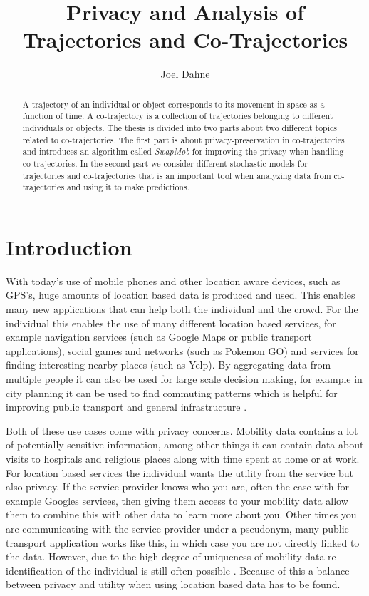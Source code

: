 \documentclass[12pt]{article}
\title{Privacy and Analysis of Trajectories and Co-Trajectories}
\author{Joel Dahne}
\theoremstyle{definition}
\begin{document}
\maketitle

\tableofcontents

\begin{abstract}
  A trajectory of an individual or object corresponds to its movement
  in space as a function of time. A co-trajectory is a collection of
  trajectories belonging to different individuals or objects. The
  thesis is divided into two parts about two different topics related
  to co-trajectories. The first part is about privacy-preservation in
  co-trajectories and introduces an algorithm called \emph{SwapMob}
  for improving the privacy when handling co-trajectories. In the
  second part we consider different stochastic models for trajectories
  and co-trajectories that is an important tool when analyzing data
  from co-trajectories and using it to make predictions.
\end{abstract}

\section{Introduction}
With today's use of mobile phones and other location aware devices,
such as GPS's, huge amounts of location based data is produced and
used. This enables many new applications that can help both the
individual and the crowd. For the individual this enables the use of
many different location based services, for example navigation
services (such as Google Maps or public transport applications),
social games and networks (such as Pokemon GO) and services for
finding interesting nearby places (such as Yelp). By aggregating data
from multiple people it can also be used for large scale decision
making, for example in city planning it can be used to find commuting
patterns which is helpful for improving public transport and general
infrastructure \cite{novak_application_2013,
  pinelli_data-driven_2016}.

Both of these use cases come with privacy concerns. Mobility data
contains a lot of potentially sensitive information, among other
things it can contain data about visits to hospitals and religious
places along with time spent at home or at work. For location based
services the individual wants the utility from the service but also
privacy. If the service provider knows who you are, often the case
with for example Googles services, then giving them access to your
mobility data allow them to combine this with other data to learn more
about you. Other times you are communicating with the service provider
under a pseudonym, many public transport application works like this,
in which case you are not directly linked to the data. However, due to
the high degree of uniqueness of mobility data re-identification of
the individual is still often possible \cite{de_montjoye_unique_2013}.
Because of this a balance between privacy and utility when using
location based data has to be found.
\end{document}
